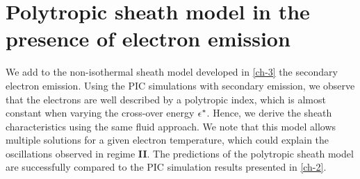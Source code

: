 



\chapter{Polytropic sheath model in the presence of electron emission}
\label{ch-4}


\begin{Chabstract}
  
We add to the non-isothermal sheath model developed in \cref{ch-3} the secondary electron emission.
Using the \ac{PIC} simulations with secondary emission, we observe that the electrons are well described by a polytropic index, which is almost constant when varying the cross-over energy $\epsilon^{*}$.
Hence, we derive the sheath characteristics using the same fluid approach.
We note that this model allows multiple solutions for a given electron temperature, which could explain the oscillations observed in regime {\bf II}.
The predictions of the polytropic sheath model are successfully compared to the \ac{PIC} simulation results presented in \cref{ch-2}.
\end{Chabstract}

% 
% 
% 
% 
% 

